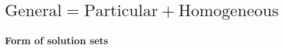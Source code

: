 \documentclass[10pt,t,serif,professionalfont]{beamer}
\begin{document}
\section{$\text{General}=\text{Particular}+\text{Homogeneous}$}
\begin{frame}
\frametitle{Form of solution sets} 

\end{frame}








% 
\end{document}
